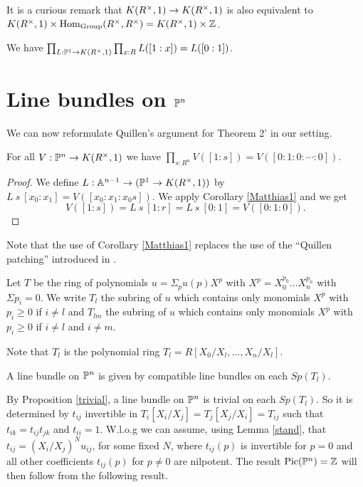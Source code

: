  It is a curious remark that $K(R^{\times},1)\rightarrow K(R^{\times},1)$ is also equivalent
 to $K(R^{\times},1)\times \mathrm{Hom}_{\mathrm{Group}}(R^\times,R^\times) = K(R^{\times},1)\times\mathbb{Z}$.

\begin{corollary}\label{Matthias1}
  We have $\prod_{L:\mathbb{P}^1\rightarrow K(R^{\times},1)}\prod_{x:R}L([1:x]) = L([0:1])$.
\end{corollary}

\section{Line bundles on $\mathbb{P}^n$}

We can now reformulate Quillen's argument for Theorem 2' \cite{Quillen} in our setting.

\begin{proposition}\label{trivial}
  For all $V:\mathbb{P}^n\rightarrow K(R^{\times},1)$ we have ${\prod_{s:R^n}V([1:s]) = V([0:1:0:\cdots :0])}$.
\end{proposition}

\begin{proof}
  We define $L:\mathbb{A}^{n-1}\rightarrow (\mathbb{P}^1 \to K(R^{\times},1))$ by $L~s~[x_0:x_1] = V([x_0:x_1:x_0s])$.
  We apply Corollary \ref{Matthias1} and we get
  $$V([1:s]) = L~s~[1:r] = L~s~[0:1] = V([0:1:0]).$$
\end{proof}

 Note that the use of Corollary \ref{Matthias1} replaces the use of the ``Quillen patching''
 \cite{lombardi-quitte} introduced in \cite{Quillen}.

\medskip

Let $T$ be the ring of polynomials $u = \Sigma_p u(p)X^p$ with
$X^p = X_0^{p_0}\dots X_n^{p_n}$ with $\Sigma p_i = 0$. We write $T_l$ the subring
of $u$ which contains only monomials $X^p$ with $p_i\geqslant 0$ if $i\neq l$
and $T_{lm}$ the subring of $u$ 
which contains only monomials $X^p$ with $p_i\geqslant 0$ if $i\neq l$ and $i\neq m$.

Note that $T_l$ is the polynomial ring $T_l = R[X_0/X_l,\dots,X_n/X_l]$.

A line bundle on $\mathbb{P}^n$ is given by compatible line bundles on each $Sp(T_l)$.

By Proposition \ref{trivial}, a line bundle on $\mathbb{P}^n$ is trivial on each $Sp(T_l)$.
So it is determined by $t_{ij}$ invertible in $T_i[X_i/X_j] = T_j[X_j/X_i] = T_{ij}$
such that $t_{ik} = t_{ij}t_{jk}$ and $t_{ii} = 1$. W.l.o.g we can assume, using Lemma \ref{stand}, that
$t_{ij} = (X_i/X_j)^N u_{ij}$, for some fixed $N$, where $t_{ij}(p)$ is invertible for $p = 0$
and all other coefficients $t_{ij}(p)$ for $p\neq 0$
are nilpotent. The result $\mathrm{Pic}(\mathbb{P}^n) = \mathbb{Z}$ will then follow from the following result.

